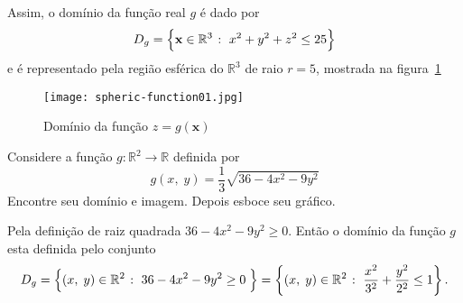 Assim, o domínio da função real \(g\) é dado por
\begin{equation*}
	D_{g} = \Bigl\{ \mathbf{x} \in \mathbb{R}^{3} \; \colon\; x^{2}+y^{2}+z^{2} \leq 25 \Bigr\}
\end{equation*}
e é representado pela região esférica do \(\mathbb{R}^{3}\) de raio \(r=5\), mostrada na figura~\ref{fig:1-6-1}
\begin{figure}[H]
	\centering
	\texttt{[image: spheric-function01.jpg]}
	\caption{Domínio da função \(z=g(\mathbf{x})\)}
	\label{fig:1-6-1}
\end{figure}
%
\begin{exer}\label{exe:1-2}
	Considere a função $g\colon \mathbb{R}^2\to \mathbb{R}$ definida por
	\begin{equation*}
		g(x,\;y)=\dfrac{1}{3}\sqrt{36-4x^{2}-9y^{2}}
	\end{equation*}
	Encontre seu domínio e imagem. Depois esboce seu gráfico.
\end{exer}

\solo Pela definição de raiz quadrada $36-4x^2-9y^2\geq 0$. Então o domínio da função $g$ esta definida pelo conjunto
\begin{equation*}
	D_{g}=\Bigl\{(x,\; y)\in \mathbb{R}^2\; \colon\; 36-4x^2-9y^2\geq 0\; \Bigr\}=\left\{(x,\; y)\in \mathbb{R}^2\; \colon\;  \frac{x^2}{3^2}+\frac{y^2}{2^2}\leq 1 \right\}.
\end{equation*}

